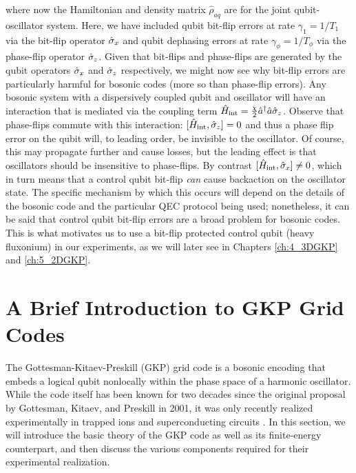 where now the Hamiltonian and density matrix $\hat{\rho}_{aq}$ are for the joint qubit-oscillator system. Here, we have included qubit bit-flip errors at rate $\gamma_1 = 1/T_1$ via the bit-flip operator $\hat{\sigma}_x$ and qubit dephasing errors at rate $\gamma_\phi = 1/T_\phi$ via the phase-flip operator $\hat{\sigma}_z$. Given that bit-flips and phase-flips are generated by the qubit operators $\hat{\sigma}_x$ and $\hat{\sigma}_z$ respectively, we might now see why bit-flip errors are particularly harmful for bosonic codes (more so than phase-flip errors). Any bosonic system with a dispersively coupled qubit and oscillator will have an interaction that is mediated via the coupling term $\hat{H}_{\rm int} = \frac{\chi}{2}\hat{a}^\dagger\hat{a}\hat{\sigma}_z$. Observe that phase-flips commute with this interaction: $[\hat{H}_{\rm int}, \hat{\sigma}_z] = 0$ and thus a phase flip error on the qubit will, to leading order, be invisible to the oscillator. Of course, this may propagate further and cause losses, but the leading effect is that oscillators should be insensitive to phase-flips. By contrast $[\hat{H}_{\rm int}, \hat{\sigma}_x] \neq 0$, which in turn means that a control qubit bit-flip \textit{can} cause backaction on the oscillator state. The specific mechanism by which this occurs will depend on the details of the bosonic code and the particular QEC protocol being used; nonetheless, it can be said that control qubit bit-flip errors are a broad problem for bosonic codes. This is what motivates us to use a bit-flip protected control qubit (heavy fluxonium) in our experiments, as we will later see in Chapters \ref{ch:4_3DGKP} and \ref{ch:5_2DGKP}. 

\clearpage
\section{A Brief Introduction to GKP Grid Codes\label{sec:2_Intro_to_GKP}}

The Gottesman-Kitaev-Preskill (GKP) grid code is a bosonic encoding that embeds a logical qubit nonlocally within the phase space of a harmonic oscillator. While the code itself has been known for two decades since the original proposal by Gottesman, Kitaev, and Preskill \cite{gottesman2001gkp} in 2001, it was only recently realized experimentally in trapped ions \cite{fluhmann2019gkp-expt, deneeve2022gkp-expt} and superconducting circuits \cite{campagne2020gkp-expt, sivak2023gkp-expt, nordquantique2023gkp-expt}. In this section, we will introduce the basic theory of the GKP code as well as its finite-energy counterpart, and then discuss the various components required for their experimental realization. 

